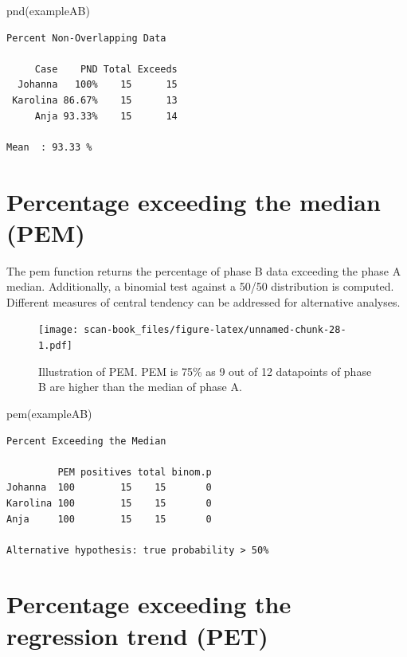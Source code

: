 \documentclass[
]{book}
\newenvironment{Shaded}{\begin{snugshade}}{\end{snugshade}}
\newcommand{\FunctionTok}[1]{\textcolor[rgb]{0.00,0.00,0.00}{#1}}
\newcommand{\NormalTok}[1]{#1}
\begin{document}
\begin{Shaded}
\begin{Highlighting}[]
\FunctionTok{pnd}\NormalTok{(exampleAB)}
\end{Highlighting}
\end{Shaded}

\begin{verbatim}
Percent Non-Overlapping Data

     Case    PND Total Exceeds
  Johanna   100%    15      15
 Karolina 86.67%    15      13
     Anja 93.33%    15      14

Mean  : 93.33 %
\end{verbatim}

\hypertarget{percentage-exceeding-the-median-pem}{%
\section{Percentage exceeding the median (PEM)}\label{percentage-exceeding-the-median-pem}}

The pem function returns the percentage of phase B data exceeding the phase A median. Additionally, a binomial test against a 50/50 distribution is computed. Different measures of central tendency can be addressed for alternative analyses.

\begin{figure}
\centering
\texttt{[image: scan-book\_files/figure-latex/unnamed-chunk-28-1.pdf]}
\caption{\label{fig:unnamed-chunk-28}Illustration of PEM. PEM is 75\% as 9 out of 12 datapoints of phase B are higher than the median of phase A.}
\end{figure}

\begin{Shaded}
\begin{Highlighting}[]
\FunctionTok{pem}\NormalTok{(exampleAB)}
\end{Highlighting}
\end{Shaded}

\begin{verbatim}
Percent Exceeding the Median

         PEM positives total binom.p
Johanna  100        15    15       0
Karolina 100        15    15       0
Anja     100        15    15       0

Alternative hypothesis: true probability > 50%
\end{verbatim}

\hypertarget{percentage-exceeding-the-regression-trend-pet}{%
\section{Percentage exceeding the regression trend (PET)}\label{percentage-exceeding-the-regression-trend-pet}}
\end{document}

